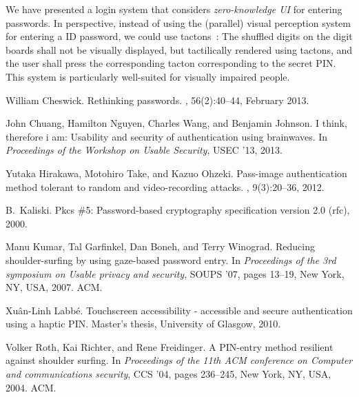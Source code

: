 \documentclass[12pt,onecolumn]{article}
\begin{document}
We have presented a login system that considers {\em zero-knowledge UI} for entering passwords.
In perspective, instead of using the (parallel) visual perception system for entering a ID password, we could use  tactons~\cite{PINTacton-2010}: 
The shuffled digits on the digit boards shall not be visually displayed, but tactilically rendered using tactons, and the user shall press the corresponding tacton corresponding to the secret PIN. This system is particularly well-suited for visually impaired people.



  
\begin{thebibliography}{10}

William Cheswick.
\newblock Rethinking passwords.
, 56(2):40--44, February 2013.

John Chuang, Hamilton Nguyen, Charles Wang, and Benjamin Johnson.
\newblock I think, therefore i am: {U}sability and security of authentication
  using brainwaves.
\newblock In {\em Proceedings of the Workshop on Usable Security}, USEC '13,
  2013.

Yutaka Hirakawa, Motohiro Take, and Kazuo Ohzeki.
\newblock Pass-image authentication method tolerant to random and
  video-recording attacks.
, 9(3):20--36, 2012.

B.~Kaliski.
\newblock Pkcs \#5: Password-based cryptography specification version 2.0
  (rfc), 2000.

Manu Kumar, Tal Garfinkel, Dan Boneh, and Terry Winograd.
\newblock Reducing shoulder-surfing by using gaze-based password entry.
\newblock In {\em Proceedings of the 3rd symposium on Usable privacy and
  security}, SOUPS '07, pages 13--19, New York, NY, USA, 2007. ACM.

Xu\^an-Linh Labb\'e.
\newblock Touchscreen accessibility - accessible and secure authentication
  using a haptic {PIN}.
\newblock Master's thesis, University of Glasgow, 2010.

Volker Roth, Kai Richter, and Rene Freidinger.
\newblock A {PIN}-entry method resilient against shoulder surfing.
\newblock In {\em Proceedings of the 11th ACM conference on Computer and
  communications security}, CCS '04, pages 236--245, New York, NY, USA, 2004.
  ACM.


\end{thebibliography}
\end{document}
